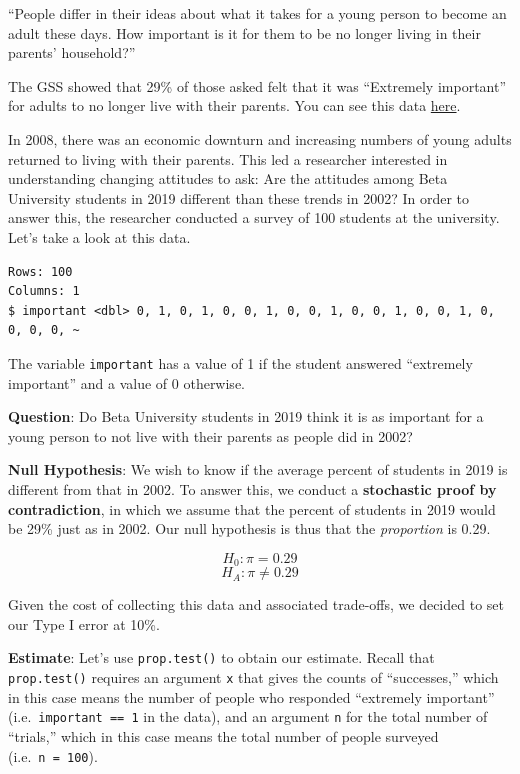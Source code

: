 \documentclass[
  letterpaper,
  DIV=11,
  numbers=noendperiod]{scrreprt}
\theoremstyle{definition}
\theoremstyle{remark}
\begin{document}
``People differ in their ideas about what it takes for a young person to
become an adult these days. How important is it for them to be no longer
living in their parents' household?''

The GSS showed that 29\% of those asked felt that it was ``Extremely
important'' for adults to no longer live with their parents. You can see
this data
\href{https://gssdataexplorer.norc.org/variables/2896/vshow}{here}.

In 2008, there was an economic downturn and increasing numbers of young
adults returned to living with their parents. This led a researcher
interested in understanding changing attitudes to ask: Are the attitudes
among Beta University students in 2019 different than these trends in
2002? In order to answer this, the researcher conducted a survey of 100
students at the university. Let's take a look at this data.

\begin{verbatim}
Rows: 100
Columns: 1
$ important <dbl> 0, 1, 0, 1, 0, 0, 1, 0, 0, 1, 0, 0, 1, 0, 0, 1, 0, 0, 0, 0, ~
\end{verbatim}

The variable \texttt{important} has a value of 1 if the student answered
``extremely important'' and a value of 0 otherwise.

\textbf{Question}: Do Beta University students in 2019 think it is as
important for a young person to not live with their parents as people
did in 2002?

\textbf{Null Hypothesis}: We wish to know if the average percent of
students in 2019 is different from that in 2002. To answer this, we
conduct a \textbf{stochastic proof by contradiction}, in which we assume
that the percent of students in 2019 would be 29\% just as in 2002. Our
null hypothesis is thus that the \emph{proportion} is 0.29.

\[H_0: \pi = 0.29\] \[H_A: \pi \neq 0.29\]

Given the cost of collecting this data and associated trade-offs, we
decided to set our Type I error at 10\%.

\textbf{Estimate}: Let's use \texttt{prop.test()} to obtain our
estimate. Recall that \texttt{prop.test()} requires an argument
\texttt{x} that gives the counts of ``successes,'' which in this case
means the number of people who responded ``extremely important''
(i.e.~\texttt{important\ ==\ 1} in the data), and an argument \texttt{n}
for the total number of ``trials,'' which in this case means the total
number of people surveyed (i.e.~\texttt{n\ =\ 100}).
\end{document}
